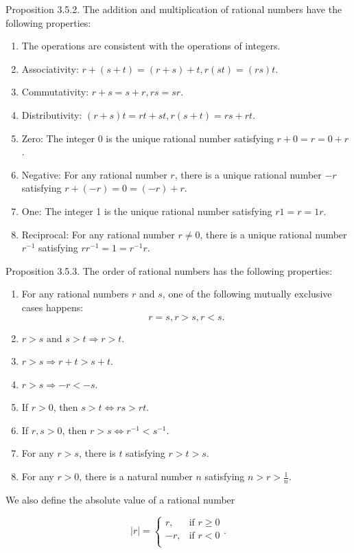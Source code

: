 \documentclass[12pt]{report}
\begin{document}
Proposition 3.5.2. The addition and multiplication of rational numbers have the following properties:
\begin{enumerate}
    \item The operations are consistent with the operations of integers.
    \item Associativity: $r + (s+t) = (r+s)+t, r(st) = (rs)t$.
    \item Commutativity: $r+s = s+r, rs=sr$.
    \item Distributivity: $(r+s)t = rt+st, r(s+t)=rs+rt$.
    \item Zero: The integer 0 is the unique rational number satisfying $r+0 = r = 0+r$.
    \item Negative: For any rational number $r$, there is a unique rational number $-r$ satisfying $r+(-r) = 0 =(-r)+r$.
    \item One: The integer 1 is the unique rational number satisfying $r1 = r = 1r$.
    \item Reciprocal: For any rational number $r\neq 0$, there is a unique rational number $r^{-1}$ satisfying $rr^{-1} = 1 = r^{-1}r$.
\end{enumerate}

Proposition 3.5.3. The order of rational numbers has the following properties:
\begin{enumerate}
    \item For any rational numbers $r$ and $s$, one of the following mutually exclusive cases happens: $$r = s, r>s, r<s.$$
    \item $r>s \text{ and }s>t \Longrightarrow r>t$.
    \item $r>s \Longrightarrow r+t>s+t$.
    \item $r>s \Longrightarrow -r<-s$.
    \item If $r>0$, then $s>t \Longleftrightarrow rs > rt$.
    \item If $r,s>0$, then $r>s \Longleftrightarrow r^{-1}<s^{-1}$.
    \item For any $r>s$, there is $t$ satisfying $r>t>s$.
    \item For any $r>0$, there is a natural number $n$ satisfying $n > r > \frac{1}{n}$.
\end{enumerate}

We also define the absolute value of a rational number 		

$$|r|=\left\{\begin{matrix}
r, &\text{if }r \geq 0  \\
-r, &\text{if }r < 0  \\
\end{matrix}\right. .$$
\end{document}
